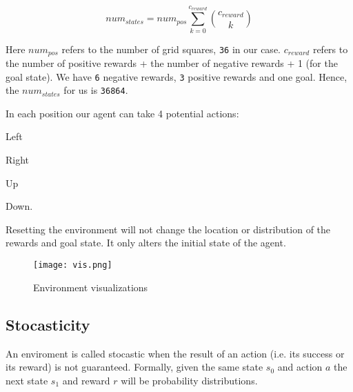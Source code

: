 \documentclass{article} %
\begin{document}
\begin{equation}
    num_{states}=num_{pos} \sum_{k=0}^{c_{reward}} {c_{reward}\choose k}
    \label{eqn:num-states}
\end{equation}

Here $num_{pos}$ refers to the number of grid squares, \verb|36| in our case. $c_{reward}$
refers to the number of positive rewards + the number of negative rewards + 1 (for the goal
state). We have \verb|6| negative rewards, \verb|3| positive rewards and one goal. Hence, 
the $num_{states}$ for us is \verb|36864|.

In each position our agent can take 4 potential actions:
\begin{enumerate*}
    \item Left
    \item Right
    \item Up
    \item Down.
\end{enumerate*}
Resetting the environment will not change the location or distribution of the rewards and
goal state. It only alters the initial state of the agent.

\begin{figure}[h]
    \begin{center}
        \texttt{[image: vis.png]}
    \end{center}
    \caption{Environment visualizations}
\end{figure}


\subsection{Stocasticity}

\label{sec:sto}
An enviroment is called stocastic when the result of an action (i.e. its success or its 
reward) is not guaranteed. Formally, given the same state $s_0$ and action $a$ the next state
$s_1$ and reward $r$ will be probability distributions.
\end{document}
